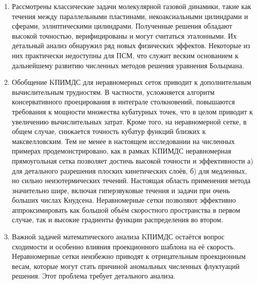 \begin{enumerate}[wide]

\item Рассмотрены классические задачи молекулярной газовой динамики,
такие как течения между параллельными пластинами, некоаксиальными цилиндрами и сферами, эллиптическими цилиндрами.
Полученные решения обладают высокой точностью, верифицированы и могут считаться эталонными.
Их детальный анализ обнаружил ряд новых физических эффектов.
Некоторые из них практически недоступны для ПСМ,
что служит веским основанием к дальнейшему развитию численных методов решения уравнения Больцмана.

\item Обобщение KПИМДС для неравномерных сеток приводит к дополнительным вычислительным трудностям.
В частности, усложняется алгоритм консервативного проецирования в интеграле столкновений,
повышаются требования к мощности множества кубатурных точек,
что в целом приводит к увеличению вычислительных затрат.
Кроме того, на неравномерной сетке, в общем случае, снижается точность кубатур функций близких к максвелловским.
Тем не менее в настоящем исследовании на численных примерах продемонстрировано,
как в рамках KПИМДС неравномерная прямоугольная сетка позволяет достичь высокой точности и эффективности
а) для детального разрешения плоских кинетических слоёв,
б) для медленных, но сильно неизотермических течений.
Настоящая область применения метода значительно шире, включая
гиперзвуковые течения и задачи при очень больших числах Кнудсена.
Неравномерные сетки позволяют эффективно аппроксимировать
как большой объём скоростного пространства в первом случае,
так и высокие градиенты функции распределения во втором.

\item Важной задачей математического анализа KПИМДС остаётся вопрос сходимости
и особенно влияния проекционного шаблона на её скорость.
Неравномерные сетки неизбежно приводят к отрицательным проекционным весам,
которые могут стать причиной аномальных численных флуктуаций решения.
Этот проблема требует детального анализа.


\end{enumerate}
